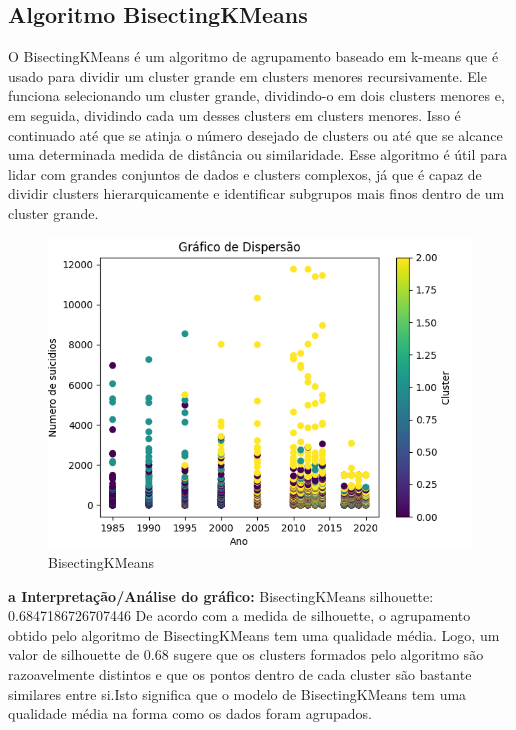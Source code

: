 \documentclass{article}
\begin{document}
\subsection{Algoritmo  BisectingKMeans }

O BisectingKMeans é um algoritmo de agrupamento baseado em k-means que é usado para dividir um cluster grande em clusters menores recursivamente. Ele funciona selecionando um cluster grande, dividindo-o em dois clusters menores e, em seguida, dividindo cada um desses clusters em clusters menores. Isso é continuado até que se atinja o número desejado de clusters ou até que se alcance uma determinada medida de distância ou similaridade. Esse algoritmo é útil para lidar com grandes conjuntos de dados e clusters complexos, já que  é capaz de dividir clusters hierarquicamente e identificar subgrupos mais finos dentro de um cluster grande.
\bigskip
\begin{figure}[ht]
    \centering
   \includegraphics[scale=0.8]{garficobk.png}
    \caption{BisectingKMeans}
   \label{fig:bk}
\end{figure}
 \newline
 \textbf{a Interpretação/Análise do gráfico:}
 \newline
  BisectingKMeans silhouette: 0.6847186726707446
 \newline
De acordo com a medida de silhouette, o agrupamento obtido pelo algoritmo de BisectingKMeans tem uma qualidade média.  Logo, um valor de silhouette de 0.68 sugere que os clusters formados pelo algoritmo são razoavelmente distintos e que os pontos dentro de cada cluster são bastante similares entre si.Isto significa que o modelo de BisectingKMeans tem uma qualidade média na forma como os dados foram agrupados.
\newpage
\end{document}
